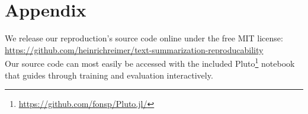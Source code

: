 \appendix
\section{Appendix} %

We release our reproduction's source code online under the free MIT license:\\
\url{https://github.com/heinrichreimer/text-summarization-reproducability}\\
Our source code can most easily be accessed with the included Pluto\footnote{\url{https://github.com/fonsp/Pluto.jl/}} notebook that guides through training and evaluation interactively.
